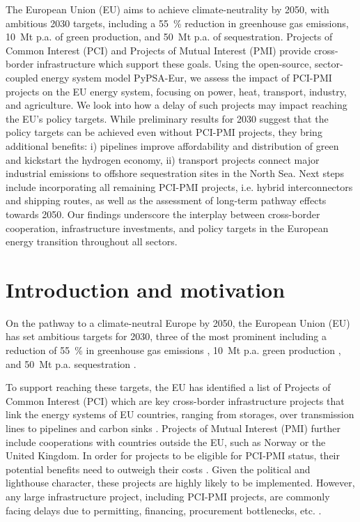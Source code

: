 \documentclass[10pt]{article}
\let\autocite\cite
\begin{document}
The European Union (EU) aims to achieve climate-neutrality by 2050, with ambitious 2030 targets, including a \SI{55}{\percent} reduction in greenhouse gas emissions, \SI{10}{Mt} p.a. of green  production, and \SI{50}{Mt} p.a. of  sequestration. Projects of Common Interest (PCI) and Projects of Mutual Interest (PMI) provide cross-border infrastructure which support these goals.
Using the open-source, sector-coupled energy system model PyPSA-Eur, we assess the impact of PCI-PMI projects on the EU energy system, focusing on power, heat, transport, industry, and agriculture. We look into how a delay of such projects may impact reaching the EU's policy targets. While preliminary results for 2030 suggest that the policy targets can be achieved even without PCI-PMI projects, they bring additional benefits: i)  pipelines improve affordability and distribution of green  and kickstart the hydrogen economy, ii)  transport projects connect major industrial emissions to offshore sequestration sites in the North Sea.
Next steps include incorporating all remaining PCI-PMI projects, i.e. hybrid interconnectors and  shipping routes, as well as the assessment of long-term pathway effects towards 2050. Our findings underscore the interplay between cross-border cooperation, infrastructure investments, and policy targets in the European energy transition throughout all sectors.

\section*{Introduction and motivation}

On the pathway to a climate-neutral Europe by 2050, the European Union (EU) has set ambitious targets for 2030, three of the most prominent including a reduction of \SI{55}{\percent} in greenhouse gas emissions \autocite{europeancommissionFit55Delivering2021}, \SI{10}{Mt} p.a. green  production \autocite{europeancommissionREPowerEUPlanCommunication2022}, and \SI{50}{Mt} p.a.  sequestration \autocite{europeanparliamentRegulationEU20242024}. 

To support reaching these targets, the EU has identified a list of Projects of Common Interest (PCI) which are key cross-border infrastructure projects that link the energy systems of EU countries, ranging from storages, over transmission lines to pipelines and carbon sinks \autocite{europeancommissionCommissionDelegatedRegulation2023}. Projects of Mutual Interest (PMI) further include cooperations with countries outside the EU, such as Norway or the United Kingdom. In order for projects to be eligible for PCI-PMI status, their potential benefits need to outweigh their costs \autocite{europeancommissionCommissionDelegatedRegulation2023}. Given the political and lighthouse character, these projects are highly likely to be implemented. However, any large infrastructure project, including PCI-PMI projects, are commonly facing delays due to permitting, financing, procurement bottlenecks, etc. \autocite{acerConsolidatedReportProgress2023}.
\end{document}
